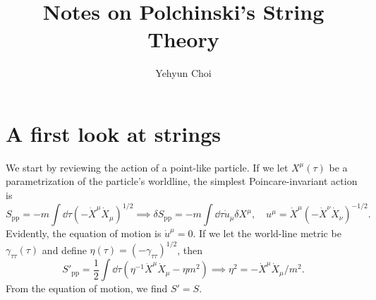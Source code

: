 \documentclass{article}
\author{Yehyun Choi}
\title{Notes on Polchinski's String Theory}
\begin{document}
\maketitle

\section{A first look at strings}

We start by reviewing the action of a point-like particle. If we let $X^\mu(\tau)$ be a parametrization of the particle's worldline, the simplest Poincare-invariant action is 
\begin{equation}
    S_\text{pp}=-m\int\dd\tau(-\dot X^\mu\dot X_\mu)^{1/2}\implies\delta S_\text{pp}=-m\int\dd\tau\dot u_\mu\delta X^\mu,\quad u^\mu=\dot X^\mu(-\dot X^\nu\dot X_\nu)^{-1/2}.
\end{equation}
Evidently, the equation of motion is $\dot u^\mu=0$. If we let the world-line metric be $\gamma_{\tau\tau}(\tau)$ and define $\eta(\tau)=(-\gamma_{\tau\tau})^{1/2}$, then 
\begin{equation}
    S'_\text{pp}=\frac 12\int\dd\tau\left(\eta^{-1}\dot X^\mu\dot X_\mu-\eta m^2\right)\implies\eta^2=-\dot X^\mu\dot X_\mu/m^2.
\end{equation}
From the equation of motion, we find $S'=S$.
\end{document}
